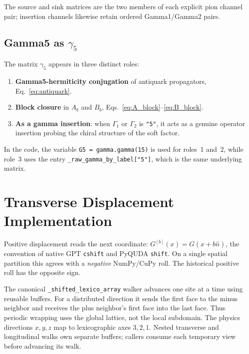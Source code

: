 \documentclass[11pt,a4paper]{article}
\newcommand{\Gfive}{\gamma_{5}}
\newcommand{\walltag}[1]{\texttt{#1}}
\begin{document}
The source and sink matrices are the two members of each explicit pion
channel pair; insertion channels likewise retain ordered Gamma1/Gamma2 pairs.

\subsection{Gamma5 as \texorpdfstring{$\Gfive$}{gamma5}}

The matrix $\Gfive$ appears in three distinct roles:

\begin{enumerate}[nosep]
  \item \textbf{Gamma5-hermiticity conjugation} of antiquark propagators,
        Eq.~\eqref{eq:antiquark}.
  \item \textbf{Block closure} in $A_{b}$ and $B_{b}$, Eqs.~\eqref{eq:A_block}--\eqref{eq:B_block}.
  \item \textbf{As a gamma insertion}: when $\Gamma_{1}$ or $\Gamma_{2}$ is
        \walltag{"5"}, it acts as a genuine operator insertion probing the chiral
        structure of the soft factor.
\end{enumerate}

In the code, the variable \walltag{G5 = gamma.gamma(15)} is used for roles~1 and~2,
while role~3 uses the entry \walltag{\_raw\_gamma\_by\_label["5"]}, which is
the same underlying matrix.


\section{Transverse Displacement Implementation}

Positive displacement reads the next coordinate:
$G^{[b]}(x)=G(x+b\hat n)$, the convention of native GPT \walltag{cshift} and
PyQUDA \walltag{shift}. On a single spatial partition this agrees with a
\emph{negative} NumPy/CuPy roll. The historical positive roll has the opposite sign.

The canonical \walltag{\_shifted\_lexico\_array} walker advances one site at a
time using reusable buffers. For a distributed direction it sends the first
face to the minus neighbor and receives the plus neighbor's first face into
the last face. Thus periodic wrapping uses the global lattice, not the local
subdomain. The physics directions $x,y,z$ map to lexicographic axes $3,2,1$.
Nested transverse and longitudinal walks own separate buffers; callers consume
each temporary view before advancing its walk.
\end{document}
